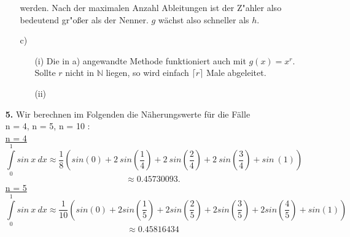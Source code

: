 \documentclass[a4paper,11pt]{article}
\begin{document}
\begin{enumerate}
\begin{enumerate}
                    werden. Nach der maximalen Anzahl Ableitungen ist der Z"ahler also bedeutend gr"oßer als der Nenner.
                    $g$ wächst also schneller als $h$.
                \item[c)]
                    \begin{enumerate}
                        \item[(i)]
                            Die in a) angewandte Methode funktioniert auch mit $g(x)=x^r$. Sollte $r$ nicht in $\mathbb{N}$ liegen, so wird einfach
                            $\lceil r \rceil$ Male abgeleitet.
                        \item[(ii)]
                            
                    \end{enumerate}
            \end{enumerate}

        \item[\textbf{5.}]
            Wir berechnen im Folgenden die Näherungswerte für die Fälle \\ n = 4, n = 5, n = 10 : \\[0.5cm]
            \underline{n = 4}
            $$ \int\limits_{0}^{1} sin \ x \ dx \approx \frac{1}{8}\left(sin(0) + 2 \ sin \left(\frac{1}{4}\right)+ 2 \ sin\left(\frac{2}{4}\right) + 2 \ sin\left(\frac{3}{4}\right)+ sin \ (1)\right)$$
            $$ \approx 0.45730093.$$ 
            \newpage
             \underline{n = 5}
            $$ \int\limits_{0}^{1} sin \ x \ dx \approx \frac{1}{10}\left(sin(0) +  2 sin\left(\frac{1}{5}\right) + 2sin\left(\frac{2}{5}\right) + 2 sin\left( \frac{3}{5}\right) + 2 sin\left( \frac{4}{5}\right) + sin(1)\right) $$
            $$ \approx 0.45816434 $$


\end{enumerate}
\end{document}
